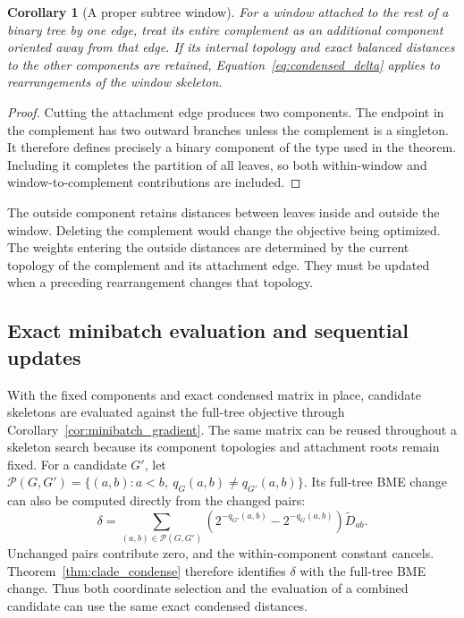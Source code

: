\documentclass[11pt,a4paper]{article}
\makeatletter
\DeclareRobustCommand{\_}{\ifmmode\nfss@text{\textunderscore}\else\textunderscore\allowbreak\fi}
\newtheorem{corollary}[theorem]{Corollary}
\theoremstyle{definition}
\makeatother
\begin{document}
\begin{corollary}[A proper subtree window]
\label{cor:outside}
For a window attached to the rest of a binary tree by one edge, treat its entire complement as an additional component oriented away from that edge.
If its internal topology and exact balanced distances to the other components are retained, Equation~\eqref{eq:condensed_delta} applies to rearrangements of the window skeleton.
\end{corollary}
\begin{proof}
Cutting the attachment edge produces two components.
The endpoint in the complement has two outward branches unless the complement is a singleton.
It therefore defines precisely a binary component of the type used in the theorem.
Including it completes the partition of all leaves, so both within-window and window-to-complement contributions are included.
\end{proof}

The outside component retains distances between leaves inside and outside the window.
Deleting the complement would change the objective being optimized.
The weights entering the outside distances are determined by the current topology of the complement and its attachment edge.
They must be updated when a preceding rearrangement changes that topology.

\subsection{Exact minibatch evaluation and sequential updates}
\label{sec:acceptance}

With the fixed components and exact condensed matrix in place, candidate skeletons are evaluated against the full-tree objective through Corollary~\ref{cor:minibatch_gradient}.
The same matrix can be reused throughout a skeleton search because its component topologies and attachment roots remain fixed.
For a candidate $G'$, let $\mathcal P(G,G')=\{(a,b):a<b,\ q_G(a,b)\ne q_{G'}(a,b)\}$.
Its full-tree BME change can also be computed directly from the changed pairs:
\begin{equation}
 \delta=\sum_{(a,b)\in\mathcal P(G,G')}
   \left(2^{-q_{G'}(a,b)}-2^{-q_G(a,b)}\right)
   \widetilde D_{ab}.
 \label{eq:changed_pairs}
\end{equation}
Unchanged pairs contribute zero, and the within-component constant cancels.
Theorem~\ref{thm:clade_condense} therefore identifies $\delta$ with the full-tree BME change.
Thus both coordinate selection and the evaluation of a combined candidate can use the same exact condensed distances.
\end{document}
